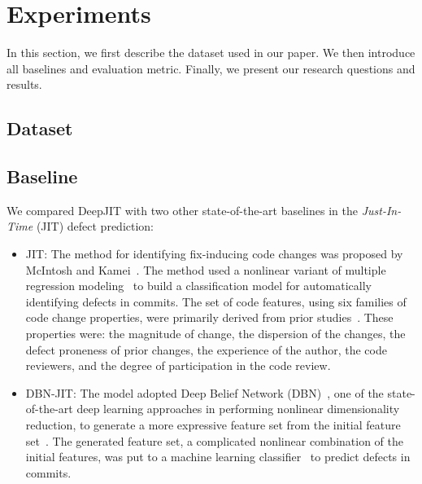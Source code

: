 \section{Experiments}
\label{sec:exp}
In this section, we first describe the dataset used in our paper. We then introduce all baselines and evaluation metric. Finally, we present our research questions and results.

\subsection{Dataset}
\label{sec:dataset}

\subsection{Baseline}
\label{sec:baseline}
We compared DeepJIT with two other state-of-the-art baselines in the \emph{Just-In-Time} (JIT) defect prediction:
\begin{itemize}
\item JIT: The method for identifying fix-inducing code changes was proposed by McIntosh and Kamei~\cite{mcintosh2018fix}. The method used a nonlinear variant of multiple regression modeling~\cite{fox1997applied} to build a classification model for automatically identifying defects in commits. The set of code features, using six families of code change properties, were primarily derived from prior studies~\cite{Kamei:2013:LES, Kim:2008:CSC, Kononenko:2015, Mockus2000}. These properties were: the magnitude of change, the dispersion of the changes, the defect proneness of prior changes, the experience of the author, the code reviewers, and the degree of participation in the code review. 
\item DBN-JIT: The model adopted Deep Belief Network (DBN)~\cite{hinton2006reducing}, one of the state-of-the-art deep learning approaches in performing nonlinear dimensionality reduction, to generate a more expressive feature set from the initial feature set~\cite{Yang:2015:DLJ}. The generated feature set, a complicated nonlinear combination of the initial features, was put to a machine learning classifier~\cite{nasrabadi2007pattern} to predict defects in commits. 
\end{itemize}

